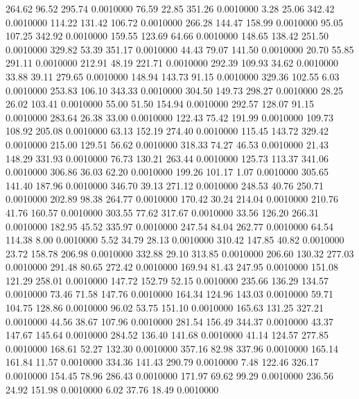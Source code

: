  264.62   96.52  295.74   0.0010000
  76.59   22.85  351.26   0.0010000
   3.28   25.06  342.42   0.0010000
 114.22  131.42  106.72   0.0010000
 266.28  144.47  158.99   0.0010000
  95.05  107.25  342.92   0.0010000
 159.55  123.69   64.66   0.0010000
 148.65  138.42  251.50   0.0010000
 329.82   53.39  351.17   0.0010000
  44.43   79.07  141.50   0.0010000
  20.70   55.85  291.11   0.0010000
 212.91   48.19  221.71   0.0010000
 292.39  109.93   34.62   0.0010000
  33.88   39.11  279.65   0.0010000
 148.94  143.73   91.15   0.0010000
 329.36  102.55    6.03   0.0010000
 253.83  106.10  343.33   0.0010000
 304.50  149.73  298.27   0.0010000
  28.25   26.02  103.41   0.0010000
  55.00   51.50  154.94   0.0010000
 292.57  128.07   91.15   0.0010000
 283.64   26.38   33.00   0.0010000
 122.43   75.42  191.99   0.0010000
 109.73  108.92  205.08   0.0010000
  63.13  152.19  274.40   0.0010000
 115.45  143.72  329.42   0.0010000
 215.00  129.51   56.62   0.0010000
 318.33   74.27   46.53   0.0010000
  21.43  148.29  331.93   0.0010000
  76.73  130.21  263.44   0.0010000
 125.73  113.37  341.06   0.0010000
 306.86   36.03   62.20   0.0010000
 199.26  101.17    1.07   0.0010000
 305.65  141.40  187.96   0.0010000
 346.70   39.13  271.12   0.0010000
 248.53   40.76  250.71   0.0010000
 202.89   98.38  264.77   0.0010000
 170.42   30.24  214.04   0.0010000
 210.76   41.76  160.57   0.0010000
 303.55   77.62  317.67   0.0010000
  33.56  126.20  266.31   0.0010000
 182.95   45.52  335.97   0.0010000
 247.54   84.04  262.77   0.0010000
  64.54  114.38    8.00   0.0010000
   5.52   34.79   28.13   0.0010000
 310.42  147.85   40.82   0.0010000
  23.72  158.78  206.98   0.0010000
 332.88   29.10  313.85   0.0010000
 206.60  130.32  277.03   0.0010000
 291.48   80.65  272.42   0.0010000
 169.94   81.43  247.95   0.0010000
 151.08  121.29  258.01   0.0010000
 147.72  152.79   52.15   0.0010000
 235.66  136.29  134.57   0.0010000
  73.46   71.58  147.76   0.0010000
 164.34  124.96  143.03   0.0010000
  59.71  104.75  128.86   0.0010000
  96.02   53.75  151.10   0.0010000
 165.63  131.25  327.21   0.0010000
  44.56   38.67  107.96   0.0010000
 281.54  156.49  344.37   0.0010000
  43.37  147.67  145.64   0.0010000
 284.52  136.40  141.68   0.0010000
  41.14  124.57  277.85   0.0010000
 168.61   52.27  132.30   0.0010000
 357.16   82.98  337.96   0.0010000
 165.14  161.84   11.57   0.0010000
 334.36  141.43  290.79   0.0010000
   7.48  122.46  326.17   0.0010000
 154.45   78.96  286.43   0.0010000
 171.97   69.62   99.29   0.0010000
 236.56   24.92  151.98   0.0010000
   6.02   37.76   18.49   0.0010000
